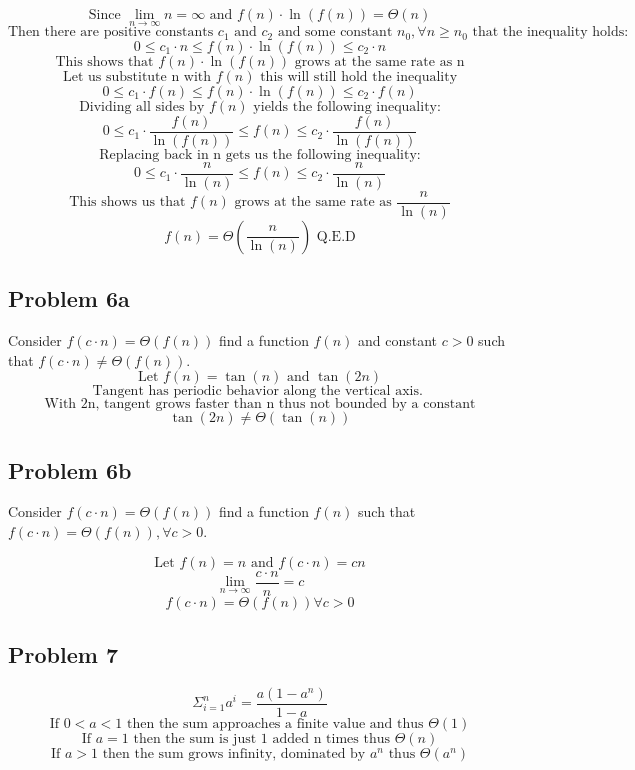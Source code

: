 \documentclass{article}
\begin{document}
$$\text{Since } \lim_{n \rightarrow \infty} n = \infty \text{ and } f(n) \cdot \ln(f(n)) = \Theta(n) $$
$$\text{Then there are positive constants } c_1 \text{ and } c_2 \text{ and some constant } n_0, \forall n \ge n_0 \text{ that the inequality holds:}$$
$$0 \le c_1 \cdot n \le f(n) \cdot \ln(f(n)) \le c_2 \cdot n$$
$$\text{This shows that } f(n)\cdot\ln(f(n)) \text{ grows at the same rate as n}$$
$$\text{Let us substitute n with } f(n) \text{ this will still hold the inequality}$$
$$0 \le c_1 \cdot f(n) \le f(n) \cdot \ln(f(n)) \le c_2 \cdot f(n)$$
$$\text{Dividing all sides by } f(n) \text{ yields the following inequality:}$$
$$0 \le c_1 \cdot \frac{f(n)}{\ln(f(n))} \le f(n) \le c_2 \cdot \frac{f(n)}{\ln(f(n))}$$
$$\text{Replacing back in n gets us the following inequality:}$$
$$0 \le c_1 \cdot \frac{n}{\ln(n)} \le f(n) \le c_2 \cdot \frac{n}{\ln(n)}$$
$$\text{This shows us that } f(n) \text{ grows at the same rate as } \frac{n}{\ln(n)}$$
$$f(n) = \Theta(\frac{n}{\ln(n)}) \text{ Q.E.D}$$

\subsection{Problem 6a}
Consider $f(c\cdot n) = \Theta(f(n))$ find a function $f(n)$ and constant $c > 0$ such that $f(c \cdot n) \neq \Theta(f(n))$.
$$\text{Let } f(n) = \tan(n) \text{ and } \tan(2n)$$
$$\text{Tangent has periodic behavior along the vertical axis. }$$
$$\text{With 2n, tangent grows faster than n thus not bounded by a constant}$$
$$\tan(2n) \neq \Theta(\tan(n))$$

\subsection{Problem 6b}
Consider $f(c\cdot n) = \Theta(f(n))$ find a function $f(n)$ such that $f(c \cdot n) = \Theta(f(n)), \forall c > 0$.

$$\text{Let } f(n) = n \text{ and } f(c \cdot n) = cn$$
$$\lim_{n \rightarrow \infty} \frac{c \cdot n}{n} = c$$
$$f(c \cdot n) = \Theta(f(n)) \forall c > 0$$

\subsection{Problem 7}

$$\Sigma_{i=1}^{n} a^i = \frac{a(1-a^n)}{1-a}$$
$$\text{If } 0 < a < 1 \text{ then the sum approaches a finite value and thus } \Theta(1)$$
$$\text{If } a = 1 \text{ then the sum is just 1 added n times thus } \Theta(n)$$
$$\text{If } a > 1 \text{ then the sum grows infinity, dominated by } a^n \text{ thus } \Theta(a^n)$$
\end{document}
